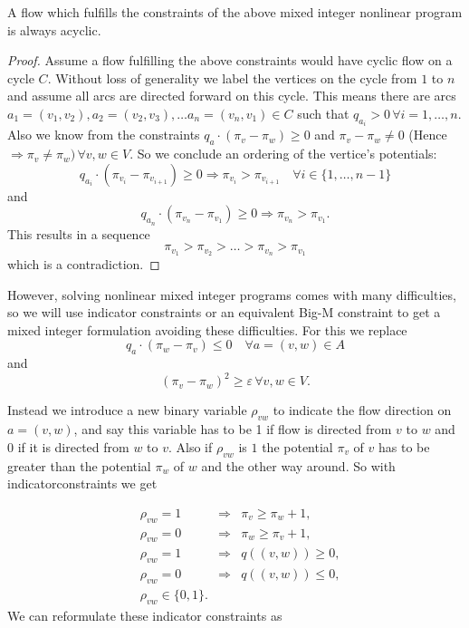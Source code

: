 \begin{prop}
 A flow which fulfills the constraints of the above mixed integer nonlinear program is always acyclic.
\end{prop}
\begin{proof}
 Assume a flow fulfilling the above constraints would have cyclic flow on a cycle $C$. Without loss of generality 
we label the vertices on the cycle from $1$ to $n$ and assume all arcs are directed forward on this cycle. This means 
there are arcs $a_1=(v_1,v_2),a_2=(v_2,v_3), \dots a_n=(v_n, v_1)\in C$ such that $q_{a_i} > 0 \,\forall i={1,\dots , 
n}$. Also we know from the constraints  $q_a\cdot (\pi_v -\pi_w)\ge 0$ and $\pi_v - \pi_w \neq 0$ (Hence $\Rightarrow 
\pi_v\neq\pi_w)\, \forall v,w\in V$. So we conclude an ordering of the vertice's potentials: 
$$q_{a_i}\cdot (\pi_{v_i} -\pi_{v_{i+1}})\ge 0 \Rightarrow \pi_{v_i}>\pi_{v_{i+1}}\quad\forall i\in\{1,\dots ,n-1\}$$ 
and 
$$q_{a_n}\cdot (\pi_{v_n} -\pi_{v_1})\ge 0 \Rightarrow \pi_{v_n}>\pi_{v_1}.$$ 
This results in a sequence $$\pi_{v_1}>\pi_{v_2}>\dots >\pi_{v_n}>\pi_{v_1}$$ which is a contradiction. \Lightning
\end{proof}

However, solving nonlinear mixed integer programs comes with many difficulties, so we will use indicator constraints 
or an equivalent Big-M constraint to get a mixed integer formulation avoiding these difficulties. For this we  replace 
$$q_a\cdot (\pi_w -\pi_v)\le 0 \quad\forall a=(v,w)\in A $$ and 
$$(\pi_v - \pi_w)^2 \ge \varepsilon \,\forall v,w \in V.$$

Instead we introduce a new binary variable $\rho_{vw}$ to indicate the flow direction on $a=(v,w)$, and say this 
variable has to be 1 if flow is directed from $v$ to $w$ and 0 if it is directed from $w$ to $v$. Also if $\rho_{vw}$ 
is $1$ the potential $\pi_v$ of $v$ has to be greater than the potential $\pi_w$ of $w$ and the other way around. So 
with indicatorconstraints we get 

\begin{align*}
 &\rho_{vw}=1 &\Rightarrow &\pi_v\ge\pi_w +1,\\
 &\rho_{vw}=0 &\Rightarrow &\pi_w\ge\pi_v +1,\\
 &\rho_{vw}=1 &\Rightarrow &q((v,w))\ge 0,\\
 &\rho_{vw}=0 &\Rightarrow &q((v,w))\le 0,\\
 &\rho_{vw} \in \{0,1\}.&&
\end{align*}
We can reformulate these indicator constraints as

